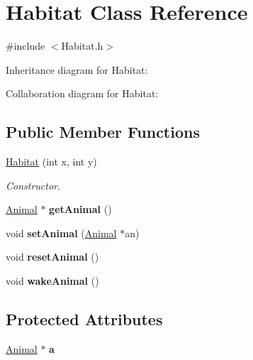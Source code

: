 \hypertarget{classHabitat}{}\section{Habitat Class Reference}
\label{classHabitat}


{\ttfamily \#include $<$Habitat.\+h$>$}



Inheritance diagram for Habitat\+:


Collaboration diagram for Habitat\+:
\subsection*{Public Member Functions}
\begin{DoxyCompactItemize}
\item 
\hyperlink{classHabitat_a7c44b3569efd42413f75b8dbc247f13d}{Habitat} (int x, int y)
\begin{DoxyCompactList}\small\item\em Constructor. \end{DoxyCompactList}\item 
\hyperlink{classAnimal}{Animal} $\ast$ {\bfseries get\+Animal} ()\hypertarget{classHabitat_adde39c6e68550831f7cf69333e6467c3}{}\label{classHabitat_adde39c6e68550831f7cf69333e6467c3}

\item 
void {\bfseries set\+Animal} (\hyperlink{classAnimal}{Animal} $\ast$an)\hypertarget{classHabitat_a1d721052c09f20e00c1719a3de9ce70a}{}\label{classHabitat_a1d721052c09f20e00c1719a3de9ce70a}

\item 
void {\bfseries reset\+Animal} ()\hypertarget{classHabitat_af7c572beb68a0d8b65c73331280fb9aa}{}\label{classHabitat_af7c572beb68a0d8b65c73331280fb9aa}

\item 
void {\bfseries wake\+Animal} ()\hypertarget{classHabitat_aafbf95dbb33f4555a037193b70e5336e}{}\label{classHabitat_aafbf95dbb33f4555a037193b70e5336e}

\end{DoxyCompactItemize}
\subsection*{Protected Attributes}
\begin{DoxyCompactItemize}
\item 
\hyperlink{classAnimal}{Animal} $\ast$ {\bfseries a}\hypertarget{classHabitat_a7ea1dfe236ddcd4121f186d75b33175a}{}\label{classHabitat_a7ea1dfe236ddcd4121f186d75b33175a}

\end{DoxyCompactItemize}


